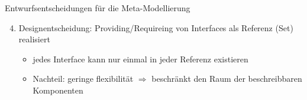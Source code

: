 \begin{frame}{Entwurfsentscheidungen für die Meta-Modellierung}
	\begin{enumerate}
		\setcounter{enumi}{3}
		\item Designentscheidung: Providing/Requireing von Interfaces als Referenz (Set) realisiert
		\begin{itemize}
			\item jedes Interface kann nur einmal in jeder Referenz existieren
			\item Nachteil: geringe flexibilität $\Rightarrow$ beschränkt den Raum der beschreibbaren Komponenten
		\end{itemize}
	\end{enumerate}
\end{frame}		